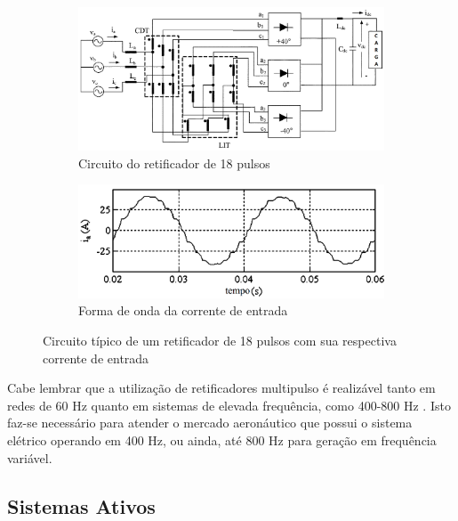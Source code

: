 \begin{figure}[!htbp] %
	\centering
	\begin{subfigure}[b]{0.49\textwidth}
		\centering
		\includegraphics[width=\textwidth]{Cap2/Figuras/18_pulse_rectifier.png}
		\caption{Circuito do retificador de 18 pulsos \cite{Singh2008}} 
		\label{fig:18_pulse_rectifier}
	\end{subfigure}%
	\hfill
	\begin{subfigure}[b]{0.49\textwidth}  
		\centering 
		\includegraphics[width=\textwidth]{Cap2/Figuras/18_pulse_wave.png}
		\caption{Forma de onda da corrente de entrada \cite{Singh2008}}    
		\label{fig:18_pulse_wave}
	\end{subfigure}%
	\caption{Circuito típico de um retificador de 18 pulsos com sua respectiva corrente de entrada}
	\label{fig:18_pulse}
\end{figure}

Cabe lembrar que a utilização de retificadores multipulso é realizável tanto em redes de 60 Hz quanto em sistemas de elevada frequência, como 400-800 Hz \cite{Gong2003,Lobo2005}. Isto faz-se necessário para atender o mercado aeronáutico que possui o sistema elétrico operando em 400 Hz, ou ainda, até 800 Hz para geração em frequência variável.

\subsection{Sistemas Ativos}

